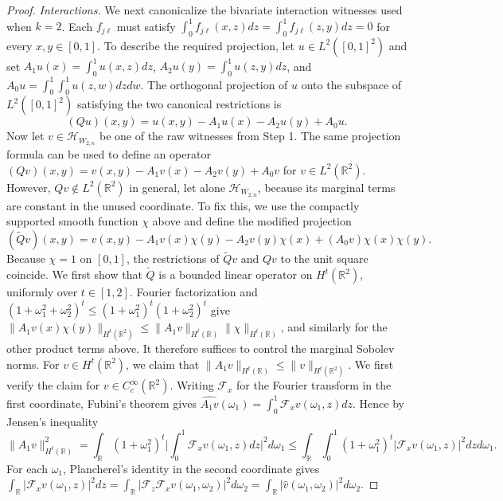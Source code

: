 \documentclass[letterpaper,12pt]{article}
\theoremstyle{definition}
\numberwithin{equation}{section}
\newcommand{\mr}{\mathbb{R}}
\newcommand{\mc}{\mathcal}
\newcommand{\norm}[1]{\lVert#1\rVert}
\begin{document}
\begin{proof}
\emph{Interactions.}
We next canonicalize the bivariate interaction witnesses used when $k=2$.
Each $f_{j\ell}$ must satisfy $\int_0^1f_{j\ell}(x,z)dz=\int_0^1f_{j\ell}(z,y)dz=0$ for every $x,y\in[0,1]$.
To describe the required projection, let $u\in L^2([0,1]^2)$ and set $A_1u(x)=\int_0^1u(x,z)dz$, $A_2u(y)=\int_0^1u(z,y)dz$, and $A_0u=\int_0^1\int_0^1u(z,w)dzdw$.
The orthogonal projection of $u$ onto the subspace of $L^2([0,1]^2)$ satisfying the two canonical restrictions is
\begin{equation}\label{equation:proof-anova-projection}
(Qu)(x,y)=u(x,y)-A_1u(x)-A_2u(y)+A_0u.
\end{equation}
Now let $v\in\mc H_{W_{2,n}}$ be one of the raw witnesses from Step 1.
The same projection formula can be used to define an operator $(Qv)(x,y)=v(x,y)-A_1v(x)-A_2v(y)+A_0v$ for $v \in L^2(\mr^2)$.
However, $Qv\notin L^2(\mr^2)$ in general, let alone $\mc H_{W_{2,n}}$, because its marginal terms are constant in the unused coordinate.
To fix this, we use the compactly supported smooth function $\chi$ above and define the modified projection
\begin{equation*}
(\widetilde Qv)(x,y)=v(x,y)-A_1v(x)\chi(y)-A_2v(y)\chi(x)+(A_0v)\chi(x)\chi(y).
\end{equation*}
Because $\chi=1$ on $[0,1]$, the restrictions of $\widetilde Qv$ and $Qv$ to the unit square coincide.
We first show that $\widetilde Q$ is a bounded linear operator on $H^t(\mr^2)$, uniformly over $t\in[1,2]$.
Fourier factorization and $(1+\omega_1^2+\omega_2^2)^t\leq(1+\omega_1^2)^t(1+\omega_2^2)^t$ give $\norm{A_1v(x)\chi(y)}_{H^t(\mr^2)}\leq\norm{A_1v}_{H^t(\mr)}\norm{\chi}_{H^t(\mr)}$, and similarly for the other product terms above.
It therefore suffices to control the marginal Sobolev norms.
For $v\in H^t(\mr^2)$, we claim that $\norm{A_1v}_{H^t(\mr)}\leq\norm{v}_{H^t(\mr^2)}$.
We first verify the claim for $v\in C_c^\infty(\mr^2)$.
Writing $\mathcal F_x$ for the Fourier transform in the first coordinate, Fubini's theorem gives $\widehat{A_1v}(\omega_1)=\int_0^1\mathcal F_xv(\omega_1,z)dz$.
Hence by Jensen's inequality
\begin{equation*}
\norm{A_1v}_{H^t(\mr)}^2=\int_{\mr}(1+\omega_1^2)^t\bigg|\int_0^1\mathcal F_xv(\omega_1,z)dz\bigg|^2d\omega_1\leq\int_{\mr}\int_0^1(1+\omega_1^2)^t|\mathcal F_xv(\omega_1,z)|^2dzd\omega_1.
\end{equation*}
For each $\omega_1$, Plancherel's identity in the second coordinate gives $\int_{\mr}|\mathcal F_xv(\omega_1,z)|^2dz=\int_{\mr}|\mathcal F_z\mathcal F_xv(\omega_1,\omega_2)|^2d\omega_2=\int_{\mr}|\widehat v(\omega_1,\omega_2)|^2d\omega_2$.

\end{proof}
\end{document}
